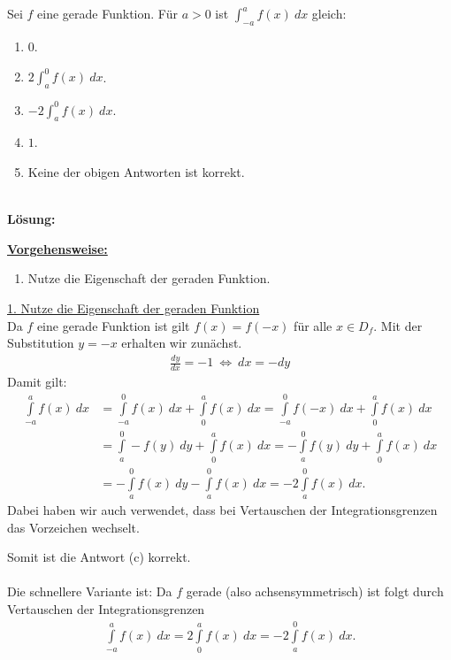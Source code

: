 \newpage

\subsection*{}
Sei $ f $ eine gerade Funktion.
Für $a > 0$ ist $\int_{-a}^a f(x) \ dx$ gleich:
\renewcommand{\labelenumi}{(\alph{enumi})}
\begin{enumerate}
	\item 
	$ 0 $.
	\item
	$ 2 \int_a^0 f(x) \ dx $.
	\item
	$ -2  \int_a^0 f(x) \ dx$.
	\item
	$ 1 $.
	\item
	Keine der obigen Antworten ist korrekt.
\end{enumerate}
\ \\
\textbf{Lösung:}
\begin{mdframed}
\underline{\textbf{Vorgehensweise:}}
\renewcommand{\labelenumi}{\theenumi.}
\begin{enumerate}
\item Nutze die Eigenschaft der geraden Funktion.
\end{enumerate}
\end{mdframed}

\underline{1. Nutze die Eigenschaft der geraden Funktion }\\
Da $f$ eine gerade Funktion ist gilt $f(x) = f(-x)$ für alle $x \in D_f$.
Mit der Substitution $y = -x $ erhalten wir zunächst.
\begin{align*}
	\frac{dy}{dx} = -1 
	\ \Leftrightarrow \
	dx = - dy
\end{align*}
Damit gilt:
\begin{align*}
	\int \limits_{- a}^a f(x) \ dx
	&=
	\int \limits_{-a}^0 f(x) \ dx
	+ 
	\int \limits_{0}^a f(x) \ dx
	=
	\int \limits_{-a}^0 f(-x) \ dx
	+ 
	\int \limits_{0}^a f(x) \ dx\\
	&=
	\int \limits_{a}^0 -f(y) \ dy
	+ 
	\int \limits_{0}^a f(x) \ dx
	=
	-\int \limits_{a}^0 f(y) \ dy
	+ 
	\int \limits_{0}^a f(x) \ dx\\
	&=
	-\int \limits_{a}^0 f(x) \ dy
	- 
	\int \limits_{a}^0 f(x) \ dx
	= 
	-2 
	\int \limits_{a}^0 f(x) \ dx.
\end{align*}
Dabei haben wir auch verwendet, dass bei Vertauschen der Integrationsgrenzen das Vorzeichen wechselt.

Somit ist die Antwort (c) korrekt.\\
\\
Die schnellere Variante ist:
Da $f$ gerade (also achsensymmetrisch) ist folgt durch Vertauschen der Integrationsgrenzen
\begin{align*}
	\int \limits_{- a}^a f(x) \ dx
	=
	2 \int \limits_{0}^a f(x) \ dx
	= 
	- 2 \int \limits_{a}^0 f(x) \ dx.
\end{align*}


